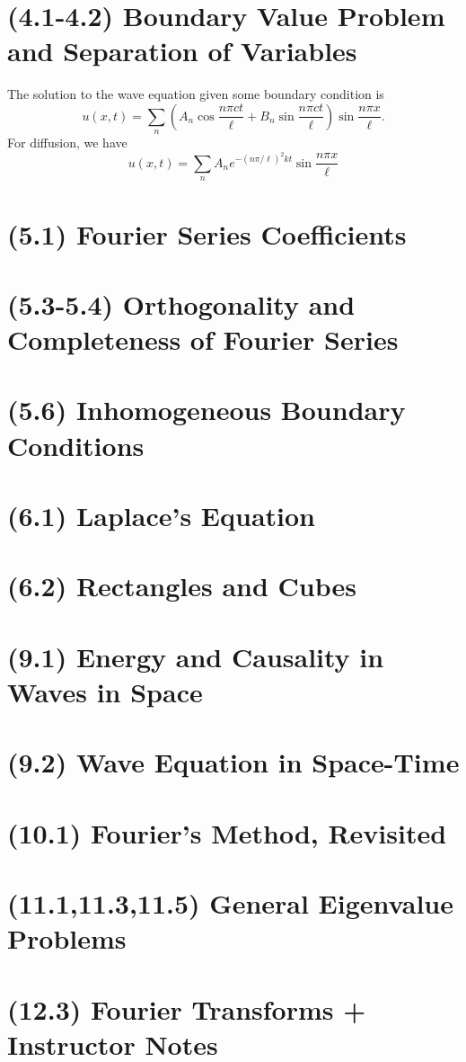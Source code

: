 \documentclass{article}
\numberwithin{equation}{section}
\begin{document}
\section{(4.1-4.2) Boundary Value Problem and Separation of Variables}
The solution to the wave equation given some boundary condition is 
\begin{equation}
    u(x,t) = \sum_n \left(A_n \cos \frac{n\pi ct}{\ell} + B_n\sin\frac{n\pi ct}{\ell}\right) \sin \frac{n\pi x}{\ell}.
\end{equation}
For diffusion, we have 
\begin{equation}
    u(x,t) = \sum_n A_ne^{-(n\pi /\ell)^2 kt}\sin\frac{n\pi x}{\ell}
\end{equation}
\section{(5.1) Fourier Series Coefficients}
\section{(5.3-5.4) Orthogonality and Completeness of Fourier Series}
\section{(5.6) Inhomogeneous Boundary Conditions}
\section{(6.1) Laplace's Equation}
\section{(6.2) Rectangles and Cubes}
\section{(9.1) Energy and Causality in Waves in Space}
\section{(9.2) Wave Equation in Space-Time}
\section{(10.1) Fourier's Method, Revisited}
\section{(11.1,11.3,11.5) General Eigenvalue Problems}
\section{(12.3) Fourier Transforms + Instructor Notes}
\end{document}
